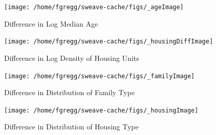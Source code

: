\documentclass[12pt,letter]{article}\usepackage[]{graphicx}\usepackage[]{color}
\newenvironment{knitrout}{}{} %
\begin{document}
\begin{figure}
\begin{knitrout}
\color{fgcolor}

{\centering \texttt{[image: /home/fgregg/sweave-cache/figs/\_ageImage]} 

}



\end{knitrout}

\caption{Difference in Log Median Age}
\end{figure}


\begin{figure}
\begin{knitrout}
\color{fgcolor}

{\centering \texttt{[image: /home/fgregg/sweave-cache/figs/\_housingDiffImage]} 

}



\end{knitrout}

\caption{Difference in Log Density of Housing Units}
\end{figure}


\begin{figure}
\begin{knitrout}
\color{fgcolor}

{\centering \texttt{[image: /home/fgregg/sweave-cache/figs/\_familyImage]} 

}



\end{knitrout}

\caption{Difference in Distribution of Family Type}
\end{figure}


\begin{figure}
\begin{knitrout}
\color{fgcolor}

{\centering \texttt{[image: /home/fgregg/sweave-cache/figs/\_housingImage]} 

}



\end{knitrout}

\caption{Difference in Distribution of Housing Type}
\end{figure}
\end{document}
